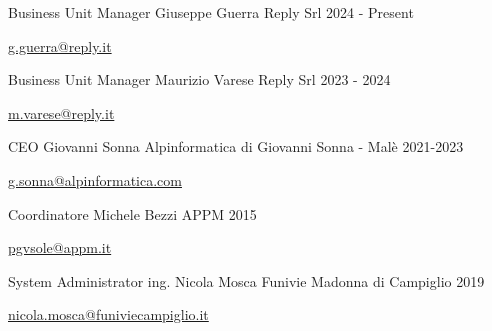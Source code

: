 

\begin{cventries}

\cventry
{Business Unit Manager} %
{Giuseppe Guerra} %
{Reply Srl} %
{2024 - Present} %
{
  \begin{cvitems} %
    \item {\href{mailto:g.guerra@reply.it}{g.guerra@reply.it}}
  \end{cvitems}
}
\cventry
{Business Unit Manager} %
{Maurizio Varese} %
{Reply Srl} %
{2023 - 2024} %
{
  \begin{cvitems} %
    \item {\href{mailto:m.varese@reply.it}{m.varese@reply.it}}
  \end{cvitems}
}

\cventry
{CEO} %
{Giovanni Sonna} %
{Alpinformatica di Giovanni Sonna - Malè} %
{2021-2023} %
{
  \begin{cvitems} %
    \item {\href{mailto:g.sonna@alpinformatica.com}{g.sonna@alpinformatica.com}}
  \end{cvitems}
}

  \cventry
    {Coordinatore} %
    {Michele Bezzi} %
    {APPM} %
    {2015} %
    {
      \begin{cvitems} %
        \item {\href{mailto:pgvsole@appm.it}{pgvsole@appm.it}}
      \end{cvitems}
    }

  \cventry
    {System Administrator} %
    {ing. Nicola Mosca} %
    {Funivie Madonna di Campiglio} %
    {2019} %
    {
      \begin{cvitems} %
        \item {\href{mailto:nicola.mosca@funiviecampiglio.it}{nicola.mosca@funiviecampiglio.it}}
      \end{cvitems}
    }


\end{cventries}
